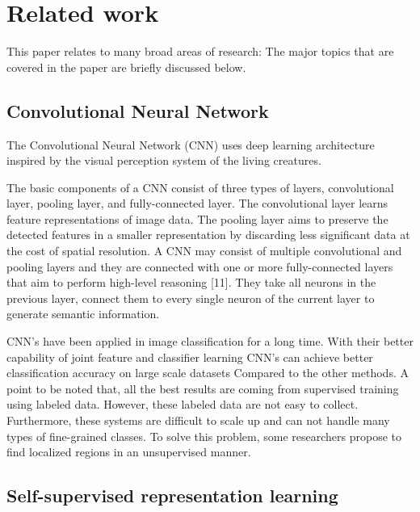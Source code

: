 \newpage


\section{Related work}

\bigskip


This paper relates to many broad areas of research: The major topics that are covered in the paper are briefly discussed below.




\subsection{Convolutional Neural Network}

The Convolutional Neural Network (CNN) uses deep learning architecture inspired by the visual perception system of the living creatures.
\cite{hubel1968receptive}

\bigskip
The basic components of a CNN consist of three types of layers, convolutional layer, pooling layer, and fully-connected layer. 
The convolutional layer learns feature representations of image data. 
The pooling layer aims to preserve the detected features in a smaller representation by discarding less significant data at the cost of spatial resolution. A CNN may consist of multiple convolutional and pooling layers and they are connected with one or more fully-connected layers that aim to perform high-level reasoning [11]. They take all neurons in the previous layer, connect them to every single neuron of the current layer to generate semantic information.\cite{zeiler2014visualizing}

\medskip

CNN's have been applied in image classification for a long time.\cite{zuo2015exemplar,nogueira2017towards} With their better capability of joint feature and classifier learning
CNN's can achieve better classification accuracy on large scale datasets 
Compared to the other methods.\cite{simonyan2014very} A point to be noted that, all the best results are coming from supervised training using labeled data. However, these labeled data are not easy to collect. Furthermore, these systems are difficult to scale up and can not handle many types of fine-grained classes. To solve this problem, some researchers propose to find localized regions in an unsupervised manner.\cite{xie2016unsupervised}


\subsection{Self-supervised representation learning}  

